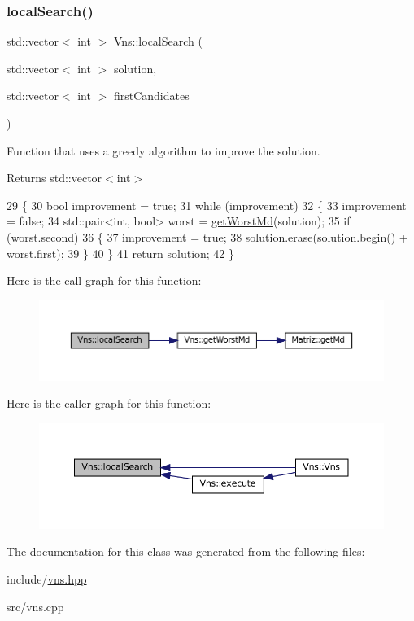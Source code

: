 \subsubsection{\texorpdfstring{local\+Search()}{localSearch()}}
{\footnotesize\ttfamily std\+::vector$<$ int $>$ Vns\+::local\+Search (\begin{DoxyParamCaption}\item[{std\+::vector$<$ int $>$}]{solution,  }\item[{std\+::vector$<$ int $>$}]{first\+Candidates }\end{DoxyParamCaption})}



Function that uses a greedy algorithm to improve the solution. 

\begin{DoxyReturn}{Returns}
std\+::vector$<$int$>$ 
\end{DoxyReturn}

\begin{DoxyCode}
29 \{
30   \textcolor{keywordtype}{bool} improvement = \textcolor{keyword}{true};
31   \textcolor{keywordflow}{while} (improvement)
32   \{
33     improvement = \textcolor{keyword}{false};
34     std::pair<int, bool> worst = \hyperlink{classVns_a2349cd809a0925058a35dea1722c7c23}{getWorstMd}(solution);
35     \textcolor{keywordflow}{if} (worst.second)
36     \{
37       improvement = \textcolor{keyword}{true};
38       solution.erase(solution.begin() + worst.first);
39     \}
40   \}
41   \textcolor{keywordflow}{return} solution;
42 \}
\end{DoxyCode}
Here is the call graph for this function\+:\nopagebreak
\begin{figure}[H]
\begin{center}
\leavevmode
\includegraphics[width=350pt]{classVns_aea2dfebed6019c61f7b7405e198d50ab_cgraph}
\end{center}
\end{figure}
Here is the caller graph for this function\+:\nopagebreak
\begin{figure}[H]
\begin{center}
\leavevmode
\includegraphics[width=350pt]{classVns_aea2dfebed6019c61f7b7405e198d50ab_icgraph}
\end{center}
\end{figure}


The documentation for this class was generated from the following files\+:\begin{DoxyCompactItemize}
\item 
include/\hyperlink{vns_8hpp}{vns.\+hpp}\item 
src/vns.\+cpp\end{DoxyCompactItemize}
